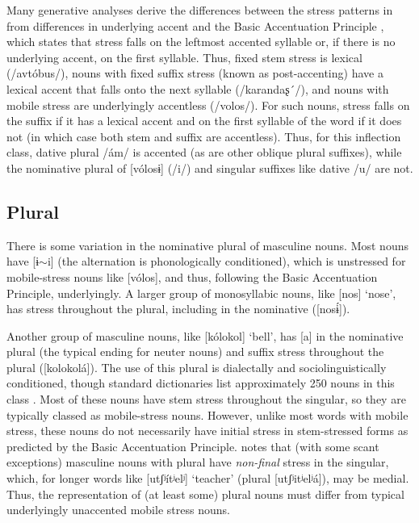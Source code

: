 \documentclass[output=paper,colorlinks,citecolor=brown
]{langscibook}
\begin{document}
Many generative analyses \citep[e.g.][]{Melvold1989,Halle1997,Revithiadou1999} %
derive the differences between the stress patterns in  \citep[see also][166--8]{Molczanow.etal2013} from differences in underlying accent and the Basic Accentuation Principle \citep{Kiparsky.Halle1977}, which states that stress falls on the leftmost accented syllable or, if there is no underlying accent, on the first syllable. Thus, fixed stem stress is lexical (/avtóbus/), nouns with fixed suffix stress (known as post-accenting) have a lexical accent that falls onto the next syllable (/karandaʂ´/), and nouns with mobile stress are underlyingly accentless (/volos/). For such nouns, stress falls on the suffix if it has a lexical accent and on the first syllable of the word if it does not (in which case both stem and suffix are accentless). Thus, for this inflection class, dative plural /ám/ is accented (as are other oblique plural suffixes), while the nominative plural of [vólosɨ] (/i/) and singular suffixes like dative /u/ are not.

\subsection{Plural}\label{sec:plbg}
There is some variation in the nominative plural of masculine nouns. Most nouns have [ɨ$\sim$i] (the alternation is phonologically conditioned), which is unstressed for mobile-stress nouns like [vólos], and thus, following the Basic Accentuation Principle, underlyingly. A larger group of monosyllabic nouns, like [nos] `nose', has stress throughout the plural, including in the nominative ([nosɨ́]).

Another group of masculine nouns, like [kólokol] `bell', has [a] in the nominative plural (the typical ending for neuter nouns) and suffix stress throughout the plural ([kolokolá]). The use of this plural is dialectally and sociolinguistically conditioned, though standard dictionaries list approximately 250 nouns in this class \citep{Worth1983}. Most of these nouns have stem stress throughout the singular, so they are typically classed as mobile-stress nouns. However, unlike most words with mobile stress, these nouns do not necessarily have initial stress in stem-stressed forms as predicted by the Basic Accentuation Principle. \citet{Shapiro1985} notes that (with some scant exceptions) masculine nouns with plural \pla{} have \emph{non-final} stress in the singular, which, for longer words like [utʃʲítʲelʲ] `teacher' (plural [utʃʲitʲelʲá]), may be medial. Thus, the representation of (at least some) plural \pla{} nouns must differ from typical underlyingly unaccented mobile stress nouns. %
\end{document}

